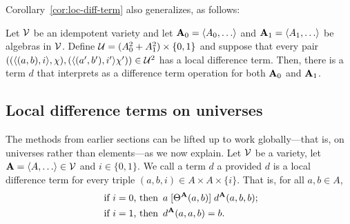 Corollary~\ref{cor:loc-diff-term} also generalizes, as follows:
\begin{cor}
  \label{cor:mix-loc-diff-term}
  Let $\mathcal{V}$ be an idempotent variety and let
  $\bA_0 = \<A_0, \dots\>$ and   $\bA_1 = \<A_1, \dots\>$ be algebras in $\mathcal{V}$. Define
  $\mathcal{U}  = (A_0^2 + A_1^2)\times \{0,1\}$
  and suppose that every pair
  $((\langle(a, b), i\rangle, \chi), (\langle(a', b'), i'\rangle\chi')) \in \mathcal{U}^2$
  has a local difference term. Then, there is a term $d$ that interprets as a
  difference term operation for both $\mathbf{A}_0$ and $\mathbf{A}_1$.
\end{cor}





\subsection{Local difference terms on universes}
\label{sec:glob-local-diff}
The methods from earlier sections can be lifted up to work globally---that is,
on universes rather than elements---as we now explain. 
Let $\mathcal{V}$ be a variety, let $\bA = \<A, \dots\> \in \sV$ 
and $i\in \{0,1\}$.
We call a term $d$ a 
provided $d$ is a local difference term for every triple
$(a,b,i) \in A \times A \times \{i\}$. That is, for all $a, b \in A$,
\begin{align}
\text{ if $i=0$, then } & \, a \mathrel{[\Theta^{\mathbf{A}}(a,b)]} d^{\mathbf{A}}(a,b,b);
\label{eq:global-diff-triple}\\
\text{ if $i=1$, then } & \,
d^{\mathbf{A}}(a,a,b) = b. 
\end{align}

